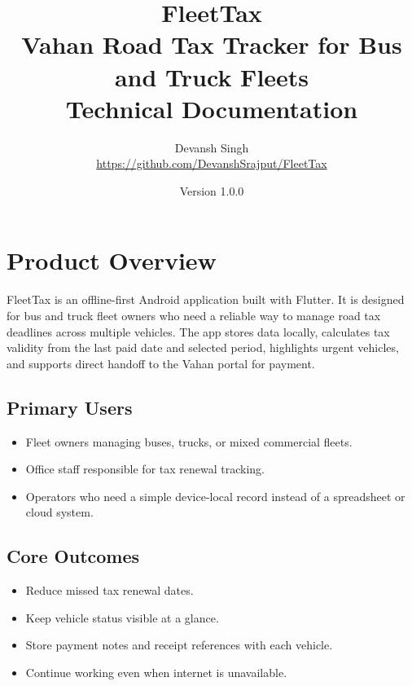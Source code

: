 \documentclass[11pt,a4paper]{article}
\title{
  \vspace{-1.4cm}
  \Huge\textbf{FleetTax}\\[0.25cm]
  \Large Vahan Road Tax Tracker for Bus and Truck Fleets\\[0.35cm]
  \normalsize Technical Documentation
}
\author{
  Devansh Singh\\
  \url{https://github.com/DevanshSrajput/FleetTax}
}
\date{Version 1.0.0}
\begin{document}
\maketitle
\thispagestyle{empty}

\begin{center}
\end{center}

\tableofcontents
\newpage

\section{Product Overview}

FleetTax is an offline-first Android application built with Flutter. It is designed for bus and truck fleet owners who need a reliable way to manage road tax deadlines across multiple vehicles. The app stores data locally, calculates tax validity from the last paid date and selected period, highlights urgent vehicles, and supports direct handoff to the Vahan portal for payment.

\subsection{Primary Users}
\begin{itemize}[leftmargin=*]
  \item Fleet owners managing buses, trucks, or mixed commercial fleets.
  \item Office staff responsible for tax renewal tracking.
  \item Operators who need a simple device-local record instead of a spreadsheet or cloud system.
\end{itemize}

\subsection{Core Outcomes}
\begin{itemize}[leftmargin=*]
  \item Reduce missed tax renewal dates.
  \item Keep vehicle status visible at a glance.
  \item Store payment notes and receipt references with each vehicle.
  \item Continue working even when internet is unavailable.
\end{itemize}
\end{document}
